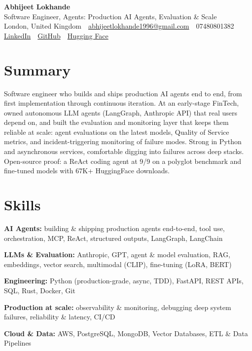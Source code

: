 \documentclass[10pt,a4paper]{article}
\newcommand{\sep}{\,\textcolor{accent!60}{\textbar}\,}
\begin{document}
\begin{center}
  {\fontsize{24}{26}\selectfont\bfseries Abhijeet Lokhande}\\[3pt]
  {\color{accent}\large Software Engineer, Agents: Production AI Agents, Evaluation \& Scale}\\[5pt]
  {\small
    London, United Kingdom \sep
    \href{mailto:abhijeetlokhande1996@gmail.com}{abhijeetlokhande1996@gmail.com} \sep
    07480801382 \\[2pt]
    \href{https://www.linkedin.com/in/ablds/}{LinkedIn} \sep
    \href{https://github.com/abhijeetscode}{GitHub} \sep
    \href{https://huggingface.co/ab-ai}{Hugging Face}
  }
\end{center}
\vspace{2pt}

\section{Summary}
Software engineer who builds and ships production AI agents end to end, from first implementation through continuous iteration. At an early-stage FinTech, owned autonomous LLM agents (LangGraph, Anthropic API) that real users depend on, and built the evaluation and monitoring layer that keeps them reliable at scale: agent evaluations on the latest models, Quality of Service metrics, and incident-triggering monitoring of failure modes. Strong in Python and asynchronous services, comfortable digging into failures across deep stacks. Open-source proof: a ReAct coding agent at 9/9 on a polyglot benchmark and fine-tuned models with 67K+ HuggingFace downloads.

\section{Skills}
\begin{tight}
  \item[\textcolor{accent}{\small$\bullet$}] \textbf{AI Agents:} building \& shipping production agents end-to-end, tool use, orchestration, MCP, ReAct, structured outputs, LangGraph, LangChain
  \item[\textcolor{accent}{\small$\bullet$}] \textbf{LLMs \& Evaluation:} Anthropic, GPT, agent \& model evaluation, RAG, embeddings, vector search, multimodal (CLIP), fine-tuning (LoRA, BERT)
  \item[\textcolor{accent}{\small$\bullet$}] \textbf{Engineering:} Python (production-grade, async, TDD), FastAPI, REST APIs, SQL, Rust, Docker, Git
  \item[\textcolor{accent}{\small$\bullet$}] \textbf{Production at scale:} observability \& monitoring, debugging deep system failures, reliability \& latency, CI/CD
  \item[\textcolor{accent}{\small$\bullet$}] \textbf{Cloud \& Data:} AWS, PostgreSQL, MongoDB, Vector Databases, ETL \& Data Pipelines
\end{tight}
\end{document}
